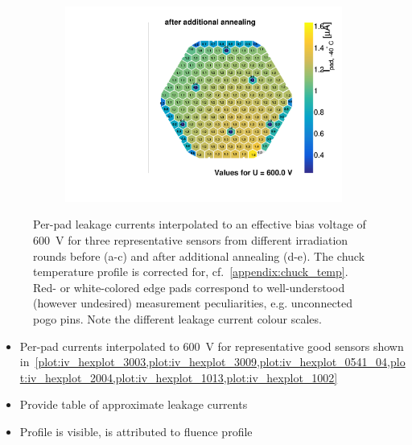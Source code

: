 \begin{figure}
\begin{subfigure}[b]{0.32\textwidth}
		\subcaption{
		}
		\label{plot:iv_hexplot_0541_04_annealed}
	\end{subfigure}
	\hfill	
	\begin{subfigure}[b]{0.32\textwidth}
		\includegraphics[width=0.999\textwidth]{plots/iv_hexplots/1013_annealed.pdf}
		\subcaption{
		}
		\label{plot:iv_hexplot_1013_annealed}
	\end{subfigure}    
	\label{plot:iv_hexplot}
	\caption{
		Per-pad leakage currents interpolated to an effective bias voltage of \SI{600}{\volt} for three representative sensors from different irradiation rounds before (a-c) and after additional annealing (d-e).
		The chuck temperature profile is corrected for, cf.~\ref{appendix:chuck_temp}.
		Red- or white-colored edge pads correspond to well-understood (however undesired) measurement peculiarities, e.g. unconnected pogo pins.
		Note the different leakage current colour scales.
	}
\end{figure}

\begin{itemize}
	\item Per-pad currents interpolated to \SI{600}{\volt} for representative good sensors shown in~\ref{plot:iv_hexplot_3003,plot:iv_hexplot_3009,plot:iv_hexplot_0541_04,plot:iv_hexplot_2004,plot:iv_hexplot_1013,plot:iv_hexplot_1002}
	\item Provide table of approximate leakage currents
	\item Profile is visible, is attributed to fluence profile
\end{itemize}



